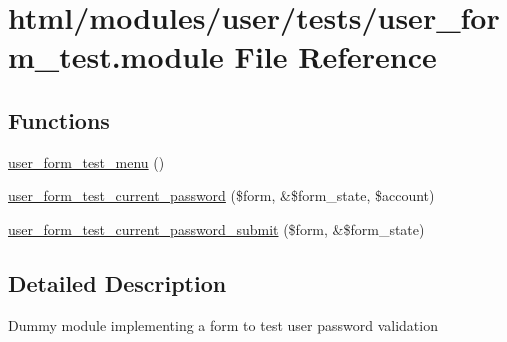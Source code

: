 \hypertarget{user__form__test_8module}{
\section{html/modules/user/tests/user\_\-form\_\-test.module File Reference}
\label{user__form__test_8module}
}
\subsection*{Functions}
\begin{DoxyCompactItemize}
\item 
\hyperlink{user__form__test_8module_a01801535f51daf09609ed5b79c5ae906}{user\_\-form\_\-test\_\-menu} ()
\item 
\hyperlink{user__form__test_8module_a7b26826dd7d47decdeb7b559cbe39a9f}{user\_\-form\_\-test\_\-current\_\-password} (\$form, \&\$form\_\-state, \$account)
\item 
\hyperlink{user__form__test_8module_abfae7592659f4e6f4cc15dcfdf79ec9c}{user\_\-form\_\-test\_\-current\_\-password\_\-submit} (\$form, \&\$form\_\-state)
\end{DoxyCompactItemize}


\subsection{Detailed Description}
Dummy module implementing a form to test user password validation 


